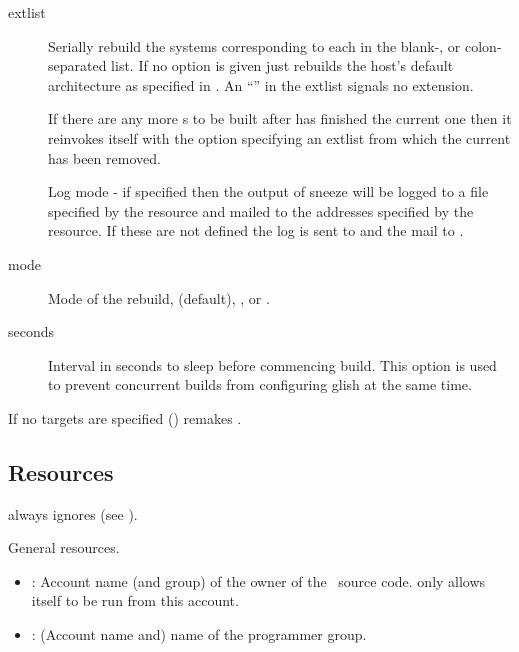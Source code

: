 \begin{description}
\item[ extlist]
   Serially rebuild the systems corresponding to each  in the
   blank-, or colon-separated list.  If no  option is given
    just rebuilds the host's default architecture as specified in
   .  An ``\code{\_}'' in the extlist signals no extension.

   If there are any more s to be built after  has
   finished the current one then it reinvokes itself with the  option
   specifying an extlist from which the current  has been
   removed.

\item[]
   Log mode - if specified then the output of sneeze will be logged to a file
   specified by the  resource and mailed
   to the addresses specified by the 
   resource.  If these are not defined the log is sent to
    and the mail to .

\item[ mode]
   Mode of the rebuild,  (default), , or
   .

\item[ seconds]
   Interval in seconds to sleep before commencing build.  This option is used
   to prevent concurrent builds from configuring glish at the same time.

\end{description}

If no targets are specified ()  remakes
.

\subsection*{Resources}

 always ignores  (see ).

\noindent
General resources.

\begin{itemize}
\item
   : Account name (and group) of the owner of the
   \aipspp\ source code.   only allows itself to be run from this
   account.

\item
   : (Account name and) name of the \aipspp
   programmer group.
\end{itemize}

